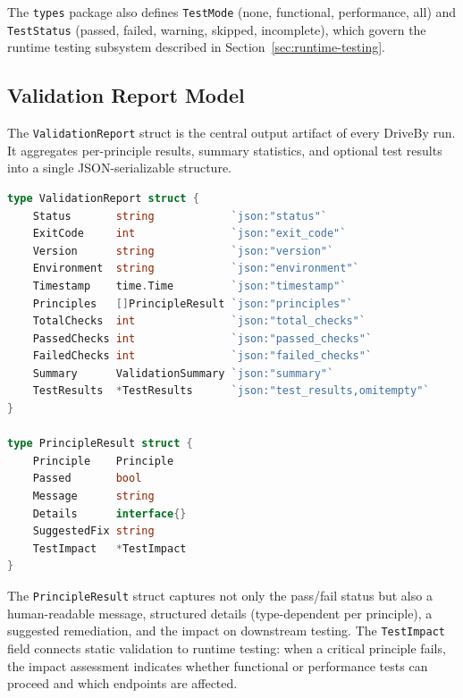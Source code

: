 The \texttt{types} package also defines \texttt{TestMode} (none, functional, performance, all) and \texttt{TestStatus} (passed, failed, warning, skipped, incomplete), which govern the runtime testing subsystem described in Section~\ref{sec:runtime-testing}.

\subsection{Validation Report Model}
\label{subsec:report-model}

The \texttt{ValidationReport} struct is the central output artifact of every DriveBy run. It aggregates per-principle results, summary statistics, and optional test results into a single JSON-serializable structure.

\begin{lstlisting}[language=Go,caption={ValidationReport and PrincipleResult (\texttt{types/report.go}).},label={lst:report}]
type ValidationReport struct {
    Status       string            `json:"status"`
    ExitCode     int               `json:"exit_code"`
    Version      string            `json:"version"`
    Environment  string            `json:"environment"`
    Timestamp    time.Time         `json:"timestamp"`
    Principles   []PrincipleResult `json:"principles"`
    TotalChecks  int               `json:"total_checks"`
    PassedChecks int               `json:"passed_checks"`
    FailedChecks int               `json:"failed_checks"`
    Summary      ValidationSummary `json:"summary"`
    TestResults  *TestResults      `json:"test_results,omitempty"`
}

type PrincipleResult struct {
    Principle    Principle
    Passed       bool
    Message      string
    Details      interface{}
    SuggestedFix string
    TestImpact   *TestImpact
}
\end{lstlisting}

The \texttt{PrincipleResult} struct captures not only the pass/fail status but also a human-readable message, structured details (type-dependent per principle), a suggested remediation, and the impact on downstream testing. The \texttt{TestImpact} field connects static validation to runtime testing: when a critical principle fails, the impact assessment indicates whether functional or performance tests can proceed and which endpoints are affected.

